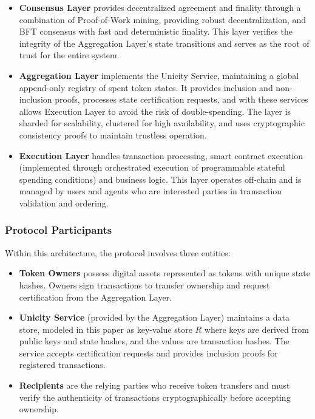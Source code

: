 \documentclass{article}
\begin{document}
\begin{itemize}
\item \textbf{Consensus Layer} provides decentralized agreement and finality through a combination of Proof-of-Work mining, providing robust decentralization, and BFT consensus with fast and deterministic finality. This layer verifies the integrity of the Aggregation Layer's state transitions and serves as the root of trust for the entire system.

\item \textbf{Aggregation Layer} implements the Unicity Service, maintaining a global append-only registry of spent token states. It provides inclusion and non-inclusion proofs, processes state certification requests, and with these services allows Execution Layer to avoid the risk of double-spending. The layer is sharded for scalability, clustered for high availability, and uses cryptographic consistency proofs to maintain trustless operation.

\item \textbf{Execution Layer} handles transaction processing, smart contract execution (implemented through orchestrated execution of programmable stateful spending conditions) and business logic. This layer operates off-chain and is managed by users and agents who are interested parties in transaction validation and ordering.
\end{itemize}

\subsubsection{Protocol Participants}

Within this architecture, the protocol involves three entities:

\begin{itemize}
\item \textbf{Token Owners} possess digital assets represented as tokens with unique state hashes. Owners sign transactions to transfer ownership and request certification from the Aggregation Layer.

\item \textbf{Unicity Service} (provided by the Aggregation Layer) maintains a data store, modeled in this paper as key-value store $R$ where keys are derived from public keys and state hashes, and the values are transaction hashes. The service accepts certification requests and provides inclusion proofs for registered transactions.

\item \textbf{Recipients} are the relying parties who receive token transfers and must verify the authenticity of transactions cryptographically before accepting ownership.
\end{itemize}
\end{document}
